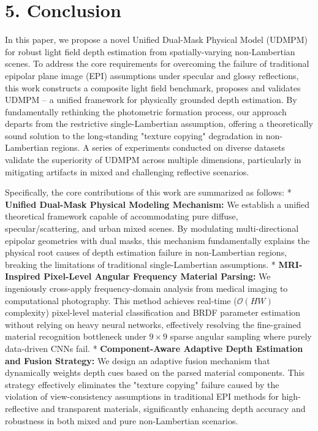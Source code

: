 \documentclass[journal]{IEEEtran}
\begin{document}
\section{5. Conclusion}

In this paper, we propose a novel Unified Dual-Mask Physical Model (UDMPM) for robust light field depth estimation from spatially-varying non-Lambertian scenes. To address the core requirements for overcoming the failure of traditional epipolar plane image (EPI) assumptions under specular and glossy reflections, this work constructs a composite light field benchmark, proposes and validates UDMPM – a unified framework for physically grounded depth estimation. By fundamentally rethinking the photometric formation process, our approach departs from the restrictive single-Lambertian assumption, offering a theoretically sound solution to the long-standing "texture copying" degradation in non-Lambertian regions. A series of experiments conducted on diverse datasets validate the superiority of UDMPM across multiple dimensions, particularly in mitigating artifacts in mixed and challenging reflective scenarios. 

Specifically, the core contributions of this work are summarized as follows:
*   \textbf{Unified Dual-Mask Physical Modeling Mechanism:} We establish a unified theoretical framework capable of accommodating pure diffuse, specular/scattering, and urban mixed scenes. By modulating multi-directional epipolar geometries with dual masks, this mechanism fundamentally explains the physical root causes of depth estimation failure in non-Lambertian regions, breaking the limitations of traditional single-Lambertian assumptions.
*   \textbf{MRI-Inspired Pixel-Level Angular Frequency Material Parsing:} We ingeniously cross-apply frequency-domain analysis from medical imaging to computational photography. This method achieves real-time ($\mathcal{O}(HW)$ complexity) pixel-level material classification and BRDF parameter estimation without relying on heavy neural networks, effectively resolving the fine-grained material recognition bottleneck under $9 \times 9$ sparse angular sampling where purely data-driven CNNs fail.
*   \textbf{Component-Aware Adaptive Depth Estimation and Fusion Strategy:} We design an adaptive fusion mechanism that dynamically weights depth cues based on the parsed material components. This strategy effectively eliminates the "texture copying" failure caused by the violation of view-consistency assumptions in traditional EPI methods for high-reflective and transparent materials, significantly enhancing depth accuracy and robustness in both mixed and pure non-Lambertian scenarios.
\end{document}
